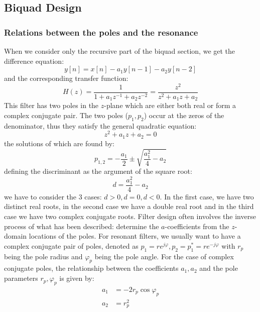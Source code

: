 \subsection{Biquad Design}


\subsubsection{Relations between the poles and the resonance}
When we consider only the recursive part of the biquad section, we get the difference equation:
\begin{equation}
 y[n] = x[n] - a_1 y[n-1] - a_2 y[n-2]
\end{equation}
and the corresponding transfer function:
\begin{equation}
 H(z) = \frac{1} {1 + a_1 z^{-1} + a_2 z^{-2}} = \frac{z^2} {z^2 + a_1 z + a_2}
\end{equation}
This filter has two poles in the $z$-plane which are either both real or form a complex conjugate pair. The two poles ($p_1, p_2$) occur at the zeros of the denominator, thus they satisfy the general quadratic equation:
\begin{equation}
 z^2 + a_1 z + a_2 = 0
\end{equation}
the solutions of which are found by:
\begin{equation}
 p_{1,2} = - \frac{a_1}{2} \pm \sqrt{ \frac{a_1^2}{4}-a_2}
\end{equation}
defining the discriminant as the argument of the square root:
\begin{equation}
 d =  \frac{a_1^2}{4} - a_2
\end{equation}
we have to consider the 3 cases: $d>0, d=0, d<0$. In the first case, we have two distinct real roots, in the second case we have a double real root and in the third case we have two complex conjugate roots. Filter design often involves the inverse process of what has been described: determine the $a$-coefficients from the $z$-domain locations of the poles. For resonant filters, we usually want to have a complex conjugate pair of poles, denoted as $p_1 = r e^{j \varphi}, p_2 = p_1^*= r e^{-j \varphi}$ with $r_p$ being the pole radius and $\varphi_p$ being the pole angle. For the case of complex conjugate poles, the relationship between the coefficients $a_1, a_2$ and the pole parameters $r_p, \varphi_p$ is given by:
\begin{equation}
\begin{aligned}
 a_1 &= -2 r_p \cos \varphi_p \\
 a_2 &= r_p^2
\end{aligned}
\end{equation}
